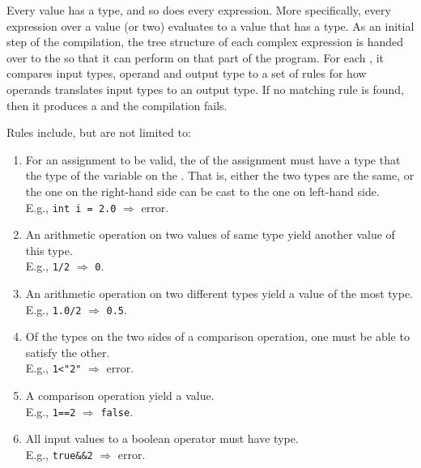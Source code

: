 Every value has a type, and so does every expression. More specifically, every expression over a value (or two) evaluates to a value that has a type. As an initial step of the compilation, the tree structure of each complex expression is handed over to the  so that it can perform  on that part of the program. For each , it compares input types, operand and output type to a set of rules for how operands translates input types to an output type. If no matching rule is found, then it produces a  and the compilation fails.

Rules include, but are not limited to:
\begin{enumerate}
  \item \label{typechecker:rule:assignment} For an assignment to be valid, the  of the assignment must have a type that  the type of the variable on the . That is, either the two types are the same, or the one on the right-hand side can be  cast to the one on left-hand side.
        \\
        E.g., \texttt{int i = 2.0} $\Rightarrow$ error.
  \item An arithmetic operation on two values of same type yield another value of this type.
        \\
        E.g., \texttt{1/2} $\Rightarrow$ \texttt{0}.
  \item An arithmetic operation on two different types yield a value of the most  type.
        \\
        E.g., \texttt{1.0/2} $\Rightarrow$ \texttt{0.5}.
  \item Of the types on the two sides of a comparison operation, one must be able to satisfy the other.
        \\
        E.g., \texttt{1<"2"} $\Rightarrow$ error.
  \item \label{typechecker:rule:comparison} A comparison operation yield a  value.
        \\
        E.g., \texttt{1==2} $\Rightarrow$ \texttt{false}.
  \item \label{typechecker:rule:boolop} All input values to a boolean operator must have  type.
        \\
        E.g., \texttt{true\&\&2} $\Rightarrow$ error.
\end{enumerate}


